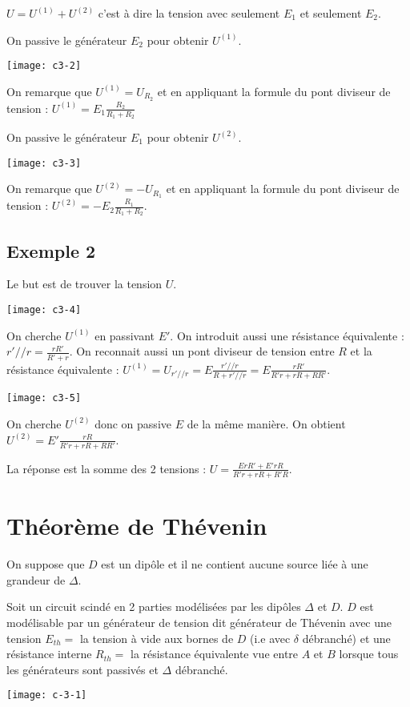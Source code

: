 \documentclass[french]{yLectureNote}
\begin{document}
$U = U^{(1)} + U^{(2)}$ c'est à dire la tension avec seulement $E_1$ et seulement $E_2$.

On passive le générateur $E_2$ pour obtenir $ U^{(1)}$.

\texttt{[image: c3-2]}

On remarque que $U^{(1)} = U_{R_2}$ et en appliquant la formule du pont diviseur de tension : $U^{(1)} = E_1\frac{R_2}{R_1+R_2}$

On passive le générateur $E_1$ pour obtenir $ U^{(2)}$.

\texttt{[image: c3-3]}

On remarque que $U^{(2)} = -U_{R_1}$ et en appliquant la formule du pont diviseur de tension : $U^{(2)} =- E_2\frac{R_1}{R_1+R_2}$.

\subsection{Exemple 2}
Le but est de trouver la tension $U$.

\texttt{[image: c3-4]}

On cherche $U^{(1)}$ en passivant $E'$. On introduit aussi une résistance équivalente : $r'//r = \frac{rR'}{R'+r}$. On reconnait aussi un pont diviseur de tension entre $R$ et la résistance équivalente : $U^{(1)} = U_{r'//r} = E\frac{r'//r}{R+r'//r}= E\frac{rR'}{R'r+rR+RR'}$.

\texttt{[image: c3-5]}

On cherche $U^{(2)}$ donc on passive $E$ de la m\^eme manière. On obtient $U^{(2)} = E'\frac{rR}{R'r+rR+RR'}$.

La réponse est la somme des 2 tensions : $U = \frac{ErR'+E'rR}{R'r+rR+R'R}$.
\section{Théorème de Thévenin}
On suppose que $D$ est un dip\^ole et il ne contient aucune source liée à une grandeur de $\Delta$.
\begin{theorem}
 Soit un circuit scindé en 2 parties modélisées par les dip\^oles $\Delta$ et $D$.  $D$ est modélisable par un générateur de tension dit générateur de Thévenin avec une tension $E_{th} = $ la tension à vide aux bornes de $D$ (i.e avec $\delta$ débranché) et une résistance interne $R_{th} = $ la résistance équivalente vue entre $A$ et $B$ lorsque tous les générateurs sont passivés et $\Delta$ débranché.
\end{theorem}
\texttt{[image: c-3-1]}
\end{document}
